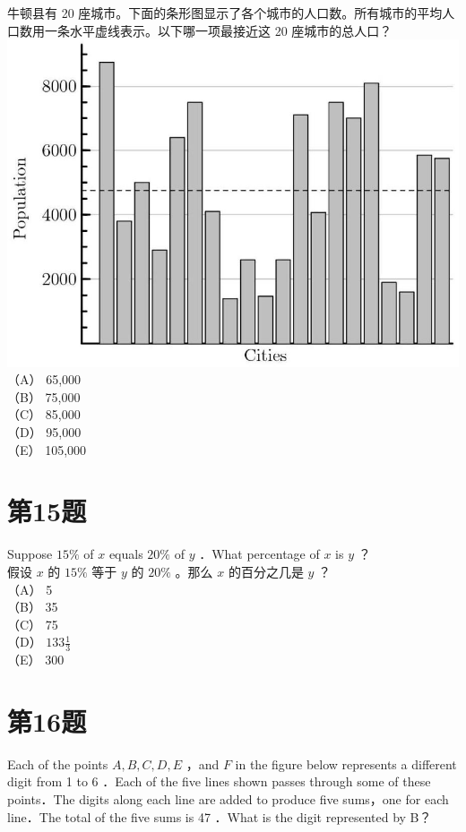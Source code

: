 \documentclass[10pt]{article}
\begin{document}
牛顿县有 20 座城市。下面的条形图显示了各个城市的人口数。所有城市的平均人口数用一条水平虚线表示。以下哪一项最接近这 20 座城市的总人口？\\
\includegraphics[max width=\textwidth, center]{2025_09_05_48544237b06df716137eg-08}\\
（A） 65,000\\
（B） 75,000\\
（C） 85,000\\
（D） 95,000\\
（E） 105,000

\section*{第15题}
Suppose $15 \%$ of $x$ equals $20 \%$ of $y$ ．What percentage of $x$ is $y$ ？\\
假设 $x$ 的 $15 \%$ 等于 $y$ 的 $20 \%$ 。那么 $x$ 的百分之几是 $y$ ？\\
（A） 5\\
（B） 35\\
（C） 75\\
（D） $133 \frac{1}{3}$\\
（E） 300

\section*{第16题}
Each of the points $A, B, C, D, E$ ，and $F$ in the figure below represents a different digit from 1 to 6 ．Each of the five lines shown passes through some of these points．The digits along each line are added to produce five sums，one for each line．The total of the five sums is 47 ．What is the digit represented by B？
\end{document}
